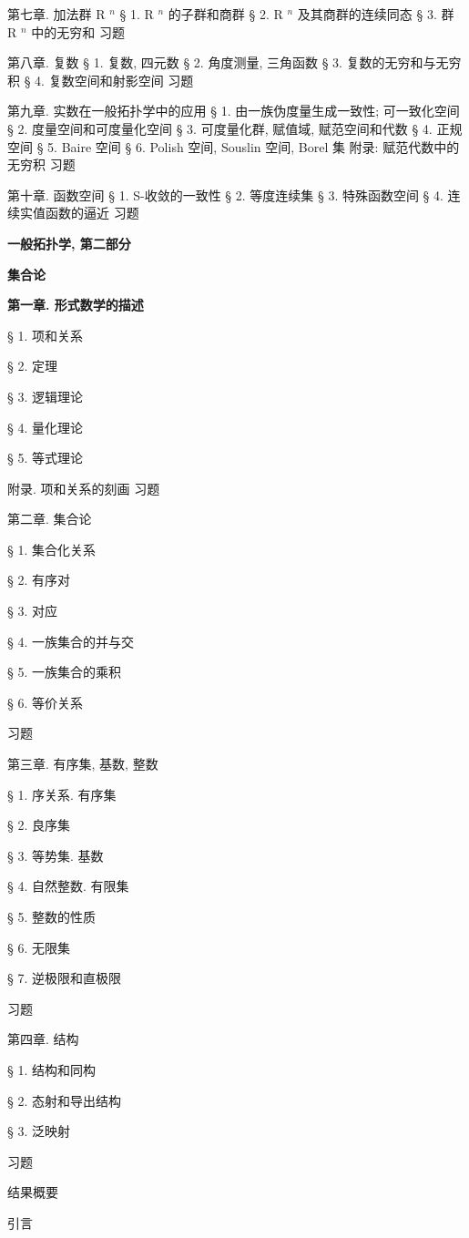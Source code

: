 第七章. 加法群 R \(^{n}\) § 1. R \(^{n}\) 的子群和商群 § 2. R \(^{n}\) 及其商群的连续同态 § 3. 群 R \(^{n}\) 中的无穷和 习题

第八章. 复数 § 1. 复数, 四元数 § 2. 角度测量, 三角函数 § 3. 复数的无穷和与无穷积 § 4. 复数空间和射影空间 习题

第九章. 实数在一般拓扑学中的应用 § 1. 由一族伪度量生成一致性; 可一致化空间 § 2. 度量空间和可度量化空间 § 3. 可度量化群, 赋值域, 赋范空间和代数 § 4. 正规空间 § 5. Baire 空间 § 6. Polish 空间, Souslin 空间, Borel 集 附录: 赋范代数中的无穷积 习题

第十章. 函数空间 § 1. S-收敛的一致性 § 2. 等度连续集 § 3. 特殊函数空间 § 4. 连续实值函数的逼近 习题

\textbf{一般拓扑学, 第二部分}

\textbf{集合论}

\textbf{第一章. 形式数学的描述}

§ 1. 项和关系

§ 2. 定理

§ 3. 逻辑理论

§ 4. 量化理论

§ 5. 等式理论

附录. 项和关系的刻画 习题

第二章. 集合论

§ 1. 集合化关系

§ 2. 有序对

§ 3. 对应

§ 4. 一族集合的并与交

§ 5. 一族集合的乘积

§ 6. 等价关系

习题

第三章. 有序集, 基数, 整数

§ 1. 序关系. 有序集

§ 2. 良序集

§ 3. 等势集. 基数

§ 4. 自然整数. 有限集

§ 5. 整数的性质

§ 6. 无限集

§ 7. 逆极限和直极限

习题

第四章. 结构

§ 1. 结构和同构

§ 2. 态射和导出结构

§ 3. 泛映射

习题

结果概要

引言

